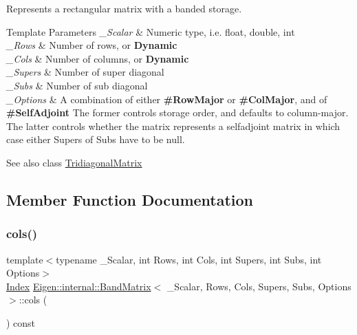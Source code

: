 Represents a rectangular matrix with a banded storage. 


\begin{DoxyTemplParams}{Template Parameters}
{\em \+\_\+\+Scalar} & Numeric type, i.\+e. float, double, int \\
\hline
{\em \+\_\+\+Rows} & Number of rows, or {\bfseries{Dynamic}} \\
\hline
{\em \+\_\+\+Cols} & Number of columns, or {\bfseries{Dynamic}} \\
\hline
{\em \+\_\+\+Supers} & Number of super diagonal \\
\hline
{\em \+\_\+\+Subs} & Number of sub diagonal \\
\hline
{\em \+\_\+\+Options} & A combination of either {\bfseries{\#\+Row\+Major}} or {\bfseries{\#\+Col\+Major}}, and of {\bfseries{\#\+Self\+Adjoint}} The former controls storage order, and defaults to column-\/major. The latter controls whether the matrix represents a selfadjoint matrix in which case either Supers of Subs have to be null.\\
\hline
\end{DoxyTemplParams}
\begin{DoxySeeAlso}{See also}
class \mbox{\hyperlink{class_eigen_1_1internal_1_1_tridiagonal_matrix}{Tridiagonal\+Matrix}} 
\end{DoxySeeAlso}


\subsection{Member Function Documentation}
\mbox{\label{class_eigen_1_1internal_1_1_band_matrix_ac2e269d04f0162379e9201f2b69c4ea6}} 
\subsubsection{\texorpdfstring{cols()}{cols()}}
{\footnotesize\ttfamily template$<$typename \+\_\+\+Scalar, int Rows, int Cols, int Supers, int Subs, int Options$>$ \\
\mbox{\hyperlink{struct_eigen_1_1_eigen_base_a554f30542cc2316add4b1ea0a492ff02}{Index}} \mbox{\hyperlink{class_eigen_1_1internal_1_1_band_matrix}{Eigen\+::internal\+::\+Band\+Matrix}}$<$ \+\_\+\+Scalar, Rows, Cols, Supers, Subs, Options $>$\+::cols (\begin{DoxyParamCaption}{ }\end{DoxyParamCaption}) const\hspace{0.3cm}{\ttfamily [inline]}}

